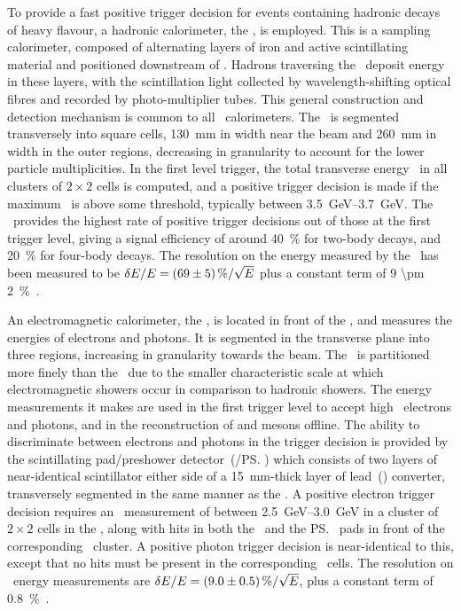 To provide a fast positive trigger decision for events containing hadronic 
decays of heavy flavour, a hadronic calorimeter, the \hcal, is employed.
This is a sampling calorimeter, composed of alternating layers of iron and 
active scintillating material and positioned downstream of \richtwo.
Hadrons traversing the \hcal\ deposit energy in these layers, with the 
scintillation light collected by wavelength-shifting optical fibres and 
recorded by photo-multiplier tubes.
This general construction and detection mechanism is common to all \lhcb\ 
calorimeters.
The \hcal\ is segmented transversely into square cells, \SI{130}{\milli\metre} 
in width near the beam and \SI{260}{\milli\metre} in width in the outer 
regions, decreasing in granularity to account for the lower particle 
multiplicities.
In the first level trigger, the total transverse energy \ET\ in all clusters of 
$2\times2$ cells is computed, and a positive trigger decision is made if the 
maximum \ET\ is above some threshold, typically between 
\SIrange{3.5}{3.7}{\GeV}.
The \hcal\ provides the highest rate of positive trigger decisions out of those 
at the first trigger level, giving a signal efficiency of around 
\SI{40}{\percent} for two-body \PB decays, and \SI{20}{\percent} for four-body 
\PD decays.
The resolution on the energy measured by the \hcal\ has been measured to be 
$\unc{E}/E = \SI{69 \pm 5}{\percent}/\sqrt{E}$ plus a constant term of \SI{9 
  \pm 2}{\percent}~\cite{Perret:2015pla}.

An electromagnetic calorimeter, the \ecal, is located in front of the \hcal, 
and measures the energies of electrons and photons.
It is segmented in the transverse plane into three regions, increasing in 
granularity towards the beam.
The \ecal\ is partitioned more finely than the \hcal\ due to the smaller 
characteristic scale at which electromagnetic showers occur in comparison to 
hadronic showers.
The energy measurements it makes are used in the first trigger level to accept 
high \ET\ electrons and photons, and in the reconstruction of \Ppizero and 
\Peta mesons offline.
The ability to discriminate between electrons and photons in the trigger 
decision is provided by the scintillating pad/preshower detector~(\spd/\ps) 
which consists of two layers of near-identical scintillator either side of a 
\SI{15}{\milli\metre}-thick layer of lead~(\ce{Pb}) converter, transversely 
segmented in the same manner as the \ecal.
A positive electron trigger decision requires an \ET\ measurement of between 
\SIrange{2.5}{3.0}{\GeV} in a cluster of $2\times2$ cells in the \ecal, along 
with hits in both the \spd\ and the \ps\ pads in front of the corresponding 
\ecal\ cluster.  A positive photon trigger decision is near-identical to this, 
except that no hits must be present in the corresponding \spd\ cells.
The resolution on \ecal\ energy measurements are $\unc{E}/E = \SI{9 \pm 
  0.5}{\percent}/\sqrt{E}$, plus a constant term of 
\SI{0.8}{\percent}~\cite{Perret:2015pla}.

